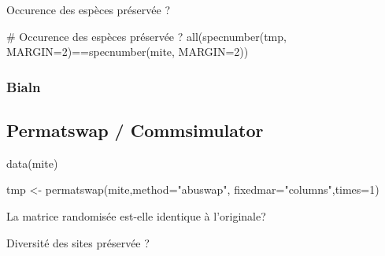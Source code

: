 \documentclass[]{article}
\newenvironment{Shaded}{\begin{snugshade}}{\end{snugshade}}
\newcommand{\KeywordTok}[1]{\textcolor[rgb]{0.94,0.87,0.69}{#1}}
\newcommand{\DataTypeTok}[1]{\textcolor[rgb]{0.87,0.87,0.75}{#1}}
\newcommand{\DecValTok}[1]{\textcolor[rgb]{0.86,0.86,0.80}{#1}}
\newcommand{\StringTok}[1]{\textcolor[rgb]{0.80,0.58,0.58}{#1}}
\newcommand{\CommentTok}[1]{\textcolor[rgb]{0.50,0.62,0.50}{#1}}
\newcommand{\OperatorTok}[1]{\textcolor[rgb]{0.94,0.94,0.82}{#1}}
\newcommand{\NormalTok}[1]{\textcolor[rgb]{0.80,0.80,0.80}{#1}}
\begin{document}
Occurence des espèces préservée ?

\begin{Shaded}
\begin{Highlighting}[]
\CommentTok{# Occurence des espèces préservée ?}
\KeywordTok{all}\NormalTok{(}\KeywordTok{specnumber}\NormalTok{(tmp, }\DataTypeTok{MARGIN=}\DecValTok{2}\NormalTok{)}\OperatorTok{==}\KeywordTok{specnumber}\NormalTok{(mite, }\DataTypeTok{MARGIN=}\DecValTok{2}\NormalTok{))}
\end{Highlighting}
\end{Shaded}

\subsubsection{Bialn}\label{bialn}

\subsection{Permatswap / Commsimulator}\label{permatswap-commsimulator}

\begin{Shaded}
\begin{Highlighting}[]
\KeywordTok{data}\NormalTok{(mite)}

\NormalTok{tmp <-}\StringTok{ }\KeywordTok{permatswap}\NormalTok{(mite,}\DataTypeTok{method=}\StringTok{"abuswap"}\NormalTok{, }\DataTypeTok{fixedmar=}\StringTok{"columns"}\NormalTok{,}\DataTypeTok{times=}\DecValTok{1}\NormalTok{)}
\end{Highlighting}
\end{Shaded}

La matrice randomisée est-elle identique à l'originale?

\begin{Shaded}
\end{Shaded}

Diversité des sites préservée ?

\begin{Shaded}
\end{Shaded}
\end{document}
